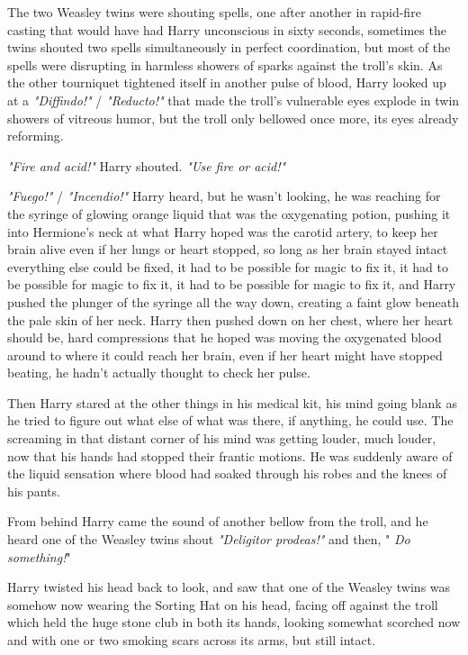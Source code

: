 The two Weasley twins were shouting spells, one after another in rapid-fire
casting that would have had Harry unconscious in sixty seconds, sometimes the
twins shouted two spells simultaneously in perfect coordination, but most of
the spells were disrupting in harmless showers of sparks against the troll's
skin. As the other tourniquet tightened itself in another pulse of blood, Harry
looked up at a \emph{"Diffindo!"} / \emph{"Reducto!"} that made the troll's vulnerable
eyes explode in twin showers of vitreous humor, but the troll only bellowed
once more, its eyes already reforming.

\emph{"Fire and acid!"} Harry shouted. \emph{"Use fire or acid!"}

\emph{"Fuego!"} / \emph{"Incendio!"} Harry heard, but he wasn't looking, he was
reaching for the syringe of glowing orange liquid that was the oxygenating
potion, pushing it into Hermione's neck at what Harry hoped was the carotid
artery, to keep her brain alive even if her lungs or heart stopped, so long as
her brain stayed intact everything else could be fixed, it had to be possible
for magic to fix it, it had to be possible for magic to fix it, it had to be
possible for magic to fix it, and Harry pushed the plunger of the syringe all
the way down, creating a faint glow beneath the pale skin of her neck. Harry
then pushed down on her chest, where her heart should be, hard compressions
that he hoped was moving the oxygenated blood around to where it could reach
her brain, even if her heart might have stopped beating, he hadn't actually
thought to check her pulse.

Then Harry stared at the other things in his medical kit, his mind going blank
as he tried to figure out what else of what was there, if anything, he could
use. The screaming in that distant corner of his mind was getting louder, much
louder, now that his hands had stopped their frantic motions. He was suddenly
aware of the liquid sensation where blood had soaked through his robes and the
knees of his pants.

From behind Harry came the sound of another bellow from the troll, and he heard
one of the Weasley twins shout \emph{"Deligitor prodeas!"} and then,
"\emph{ Do something!}"

Harry twisted his head back to look, and saw that one of the Weasley twins was
somehow now wearing the Sorting Hat on his head, facing off against the troll
which held the huge stone club in both its hands, looking somewhat scorched now
and with one or two smoking scars across its arms, but still intact.

